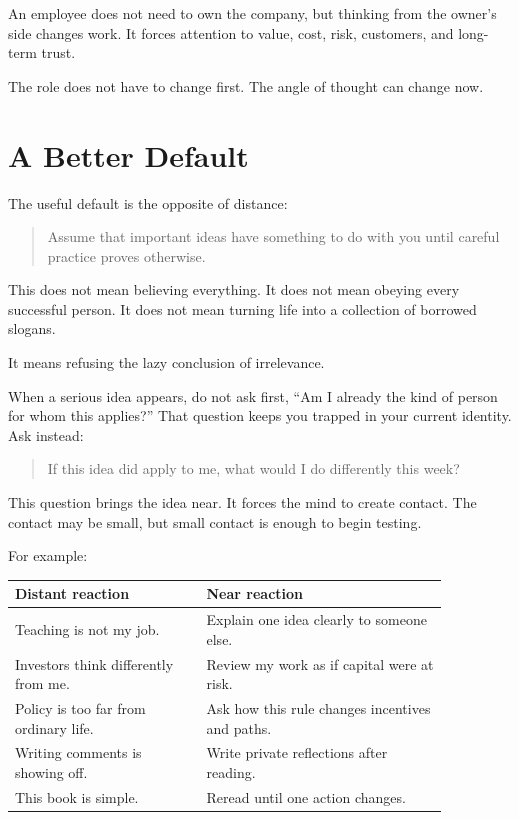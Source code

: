 An employee does not need to own the company, but thinking from the owner's side changes work. It forces attention to value, cost, risk, customers, and long-term trust.

The role does not have to change first. The angle of thought can change now.

\section*{A Better Default}

The useful default is the opposite of distance:

\begin{quote}
Assume that important ideas have something to do with you until careful practice proves otherwise.
\end{quote}

This does not mean believing everything. It does not mean obeying every successful person. It does not mean turning life into a collection of borrowed slogans.

It means refusing the lazy conclusion of irrelevance.

When a serious idea appears, do not ask first, ``Am I already the kind of person for whom this applies?'' That question keeps you trapped in your current identity. Ask instead:

\begin{quote}
If this idea did apply to me, what would I do differently this week?
\end{quote}

This question brings the idea near. It forces the mind to create contact. The contact may be small, but small contact is enough to begin testing.

For example:

\begin{center}
\begin{tabular}{p{0.38\linewidth}p{0.48\linewidth}}
\hline
Distant reaction & Near reaction \\
\hline
Teaching is not my job. & Explain one idea clearly to someone else. \\
Investors think differently from me. & Review my work as if capital were at risk. \\
Policy is too far from ordinary life. & Ask how this rule changes incentives and paths. \\
Writing comments is showing off. & Write private reflections after reading. \\
This book is simple. & Reread until one action changes. \\
\hline
\end{tabular}
\end{center}

